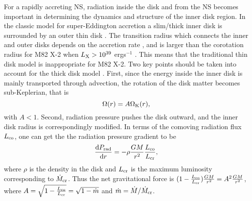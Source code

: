 \documentclass[12pt,preprint]{aastex}
\begin{document}
For a rapidly accreting NS, radiation inside the disk and from the NS becomes important in determining the dynamics and structure of the inner disk region. In the classic model for super-Eddington accretion a slim/thick inner disk is surrounded by an outer thin disk \citep{acl1988,wft2000,s2011}. The transition radius which connects the inner and outer disks depends on the accretion rate \citep{yn2004,g2012}, and is larger than the corotation radius for M82 X-2 when $L_{\rm X}>10^{39}$ ergs$^{-1}$ \citep{dpp2016}. This means that the traditional thin disk model is  inappropriate for M82 X-2. Two key points should be taken into account for the thick disk model \citep{ywv1997,aghw2005}. First, since the energy inside the inner disk is mainly transported through advection, the rotation of the disk matter becomes sub-Keplerian, that is
\begin{equation}
\Omega(r)=A \Omega_{\rm K}(r),
\end{equation}
with $A<1$. Second, radiation pressure pushes the disk outward, and the inner disk radius is correspondingly modified. In terms of the comoving radiation flux $L_{\rm co}$, one can get the the radiation pressure gradient to be \citep{aghw2005}
\begin{equation}
\frac{{\rm d}P_{\rm rad}}{{\rm d}r}=-\rho \frac{GM}{r^2} \frac{L_{\rm co}}{L_{\rm cr}},
\end{equation}
where $\rho$ is the density in the disk and $L_{\rm cr}$ is the maximum luminosity corresponding to $\dot{M}_{\rm cr}$.
Thus the net gravitational force is $(1-\frac{L_{\rm co}}{L_{\rm cr}})\frac{GM}{r^2}=A^2\frac{GM}{r^2}$, where $A=\sqrt{1-\frac{L_{\rm co}}{L_{\rm cr}}}=\sqrt{1-\dot{m}}$ and $\dot{m}=\dot{M}/\dot{M}_{\rm cr}$.
\end{document}
